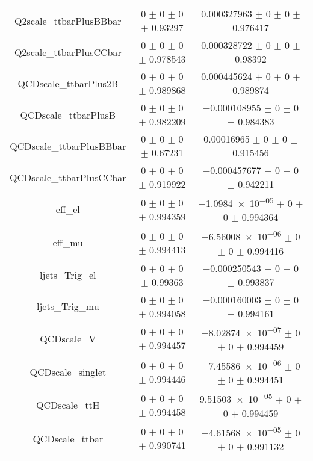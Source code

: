 \begin{table}
\begin{tabular}{ccc}
Q2scale\_ttbarPlusBBbar & \num{0} $\pm$ \num{0} $\pm$ \num{0} $\pm$ \num{0.93297} & \num{0.000327963} $\pm$ \num{0} $\pm$ \num{0} $\pm$ \num{0.976417}\\
Q2scale\_ttbarPlusCCbar & \num{0} $\pm$ \num{0} $\pm$ \num{0} $\pm$ \num{0.978543} & \num{0.000328722} $\pm$ \num{0} $\pm$ \num{0} $\pm$ \num{0.98392}\\
QCDscale\_ttbarPlus2B & \num{0} $\pm$ \num{0} $\pm$ \num{0} $\pm$ \num{0.989868} & \num{0.000445624} $\pm$ \num{0} $\pm$ \num{0} $\pm$ \num{0.989874}\\
QCDscale\_ttbarPlusB & \num{0} $\pm$ \num{0} $\pm$ \num{0} $\pm$ \num{0.982209} & \num{-0.000108955} $\pm$ \num{0} $\pm$ \num{0} $\pm$ \num{0.984383}\\
QCDscale\_ttbarPlusBBbar & \num{0} $\pm$ \num{0} $\pm$ \num{0} $\pm$ \num{0.67231} & \num{0.00016965} $\pm$ \num{0} $\pm$ \num{0} $\pm$ \num{0.915456}\\
QCDscale\_ttbarPlusCCbar & \num{0} $\pm$ \num{0} $\pm$ \num{0} $\pm$ \num{0.919922} & \num{-0.000457677} $\pm$ \num{0} $\pm$ \num{0} $\pm$ \num{0.942211}\\
eff\_el & \num{0} $\pm$ \num{0} $\pm$ \num{0} $\pm$ \num{0.994359} & \num{-1.0984e-05} $\pm$ \num{0} $\pm$ \num{0} $\pm$ \num{0.994364}\\
eff\_mu & \num{0} $\pm$ \num{0} $\pm$ \num{0} $\pm$ \num{0.994413} & \num{-6.56008e-06} $\pm$ \num{0} $\pm$ \num{0} $\pm$ \num{0.994416}\\
ljets\_Trig\_el & \num{0} $\pm$ \num{0} $\pm$ \num{0} $\pm$ \num{0.99363} & \num{-0.000250543} $\pm$ \num{0} $\pm$ \num{0} $\pm$ \num{0.993837}\\
ljets\_Trig\_mu & \num{0} $\pm$ \num{0} $\pm$ \num{0} $\pm$ \num{0.994058} & \num{-0.000160003} $\pm$ \num{0} $\pm$ \num{0} $\pm$ \num{0.994161}\\
QCDscale\_V & \num{0} $\pm$ \num{0} $\pm$ \num{0} $\pm$ \num{0.994457} & \num{-8.02874e-07} $\pm$ \num{0} $\pm$ \num{0} $\pm$ \num{0.994459}\\
QCDscale\_singlet & \num{0} $\pm$ \num{0} $\pm$ \num{0} $\pm$ \num{0.994446} & \num{-7.45586e-06} $\pm$ \num{0} $\pm$ \num{0} $\pm$ \num{0.994451}\\
QCDscale\_ttH & \num{0} $\pm$ \num{0} $\pm$ \num{0} $\pm$ \num{0.994458} & \num{9.51503e-05} $\pm$ \num{0} $\pm$ \num{0} $\pm$ \num{0.994459}\\
QCDscale\_ttbar & \num{0} $\pm$ \num{0} $\pm$ \num{0} $\pm$ \num{0.990741} & \num{-4.61568e-05} $\pm$ \num{0} $\pm$ \num{0} $\pm$ \num{0.991132}\\

\end{tabular}
\end{table}
